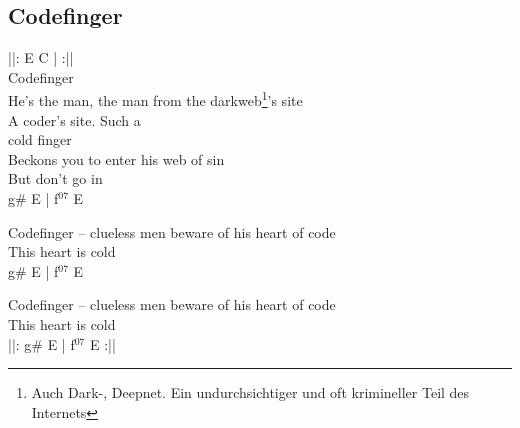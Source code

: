 \subsection{Codefinger}

\textcolor{\chordcolor}{||: E C | \hspace{0.8cm} :||}\\

Codefinger \\
He’s the man, the man from the darkweb\footnote{\scriptsize Auch Dark-, Deepnet. Ein undurchsichtiger und oft krimineller Teil des Internets}’s site \\
A coder’s site. \hspace{.4cm} Such a \\

cold finger \\
Beckons you to enter his web of sin \\
But don’t go in \\

\textcolor{\chordcolor}{g\# E | f$^{07}$ E} \\


Codefinger -- clueless men beware of his heart of code \\
This heart is cold \\

\textcolor{\chordcolor}{g\# E | f$^{07}$ E} \\


Codefinger -- clueless men beware of his heart of code \\
This heart is cold \\

\textcolor{\chordcolor}{||: g\# E | f$^{07}$ E :||}\\


\pagebreak

